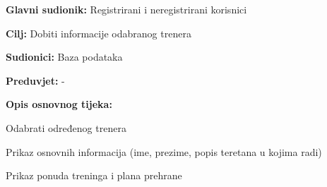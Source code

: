 				\noindent {}
					\begin{packed_item}
	
						\item \textbf{Glavni sudionik: } Registrirani i neregistrirani korisnici
						\item  \textbf{Cilj:} Dobiti informacije odabranog trenera
						\item  \textbf{Sudionici:} Baza podataka
						\item  \textbf{Preduvjet:} -
						\item  \textbf{Opis osnovnog tijeka:}
						
						\item[] \begin{packed_enum}
	
							\item Odabrati određenog trenera
							\item Prikaz osnovnih informacija (ime, prezime, popis teretana u kojima radi)
							\item Prikaz ponuda treninga i plana prehrane
						\end{packed_enum}
						
					\end{packed_item}
				
